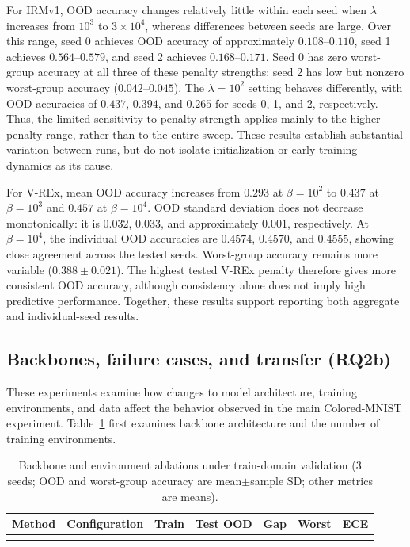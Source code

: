 \documentclass[12pt,a4paper]{article}
\begin{document}
For IRMv1, OOD accuracy changes relatively little within each seed when
$\lambda$ increases from $10^3$ to $3\times10^4$, whereas differences between
seeds are large. Over this range, seed 0 achieves OOD accuracy of approximately
$0.108$--$0.110$, seed 1 achieves $0.564$--$0.579$, and seed 2 achieves
$0.168$--$0.171$. Seed 0 has zero worst-group accuracy at all three of these
penalty strengths; seed 2 has low but nonzero worst-group accuracy
($0.042$--$0.045$). The $\lambda=10^2$ setting behaves differently, with
OOD accuracies of $0.437$, $0.394$, and $0.265$ for seeds 0, 1, and 2,
respectively. Thus, the limited sensitivity to penalty strength applies mainly
to the higher-penalty range, rather than to the entire sweep. These results
establish substantial variation between runs, but do not isolate initialization
or early training dynamics as its cause.

For V-REx, mean OOD accuracy increases from $0.293$ at $\beta=10^2$ to
$0.437$ at $\beta=10^3$ and $0.457$ at $\beta=10^4$. OOD standard deviation
does not decrease monotonically: it is $0.032$, $0.033$, and approximately
$0.001$, respectively. At $\beta=10^4$, the individual OOD accuracies are
$0.4574$, $0.4570$, and $0.4555$, showing close agreement across the tested
seeds. Worst-group accuracy remains more variable ($0.388\pm0.021$).
The highest tested V-REx penalty therefore gives more consistent OOD accuracy,
although consistency alone does not imply high predictive performance. Together,
these results support reporting both aggregate and individual-seed results.

\FloatBarrier
\subsection{Backbones, failure cases, and transfer (RQ2b)}

These experiments examine how changes to model architecture, training
environments, and data affect the behavior observed in the main Colored-MNIST
experiment. Table~\ref{tab:backbone-env} first examines backbone architecture
and the number of training environments.

\begin{table}[!htbp]
\centering
\small
\setlength{\tabcolsep}{4pt}
\caption[Backbone and environment ablations]{Backbone and environment ablations under train-domain validation
(3 seeds; OOD and worst-group accuracy are mean$\pm$sample SD; other metrics are means).}
\label{tab:backbone-env}
\setlength{\tabcolsep}{4pt}
\begin{tabular}{llccccc}
\toprule
Method & Configuration & Train & Test OOD & Gap & Worst & ECE \\
\midrule

\\
\bottomrule
\end{tabular}
\end{table}
\end{document}
